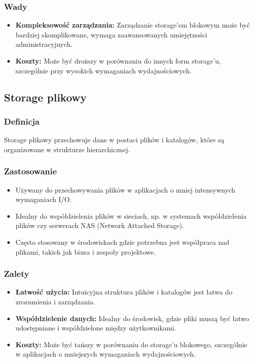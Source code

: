 \documentclass[polish,envcountsect,10pt]{article}
\begin{document}
\subsubsection{Wady}
\begin{itemize}
    \item \textbf{Kompleksowość zarządzania:} Zarządzanie storage'em blokowym może być bardziej skomplikowane, wymaga zaawansowanych umiejętności administracyjnych.
    \item \textbf{Koszty:} Może być droższy w porównaniu do innych form storage'u, szczególnie przy wysokich wymaganiach wydajnościowych.
\end{itemize}

\subsection{Storage plikowy}

\subsubsection{Definicja}
Storage plikowy przechowuje dane w postaci plików i katalogów, które są organizowane w strukturze hierarchicznej.

\subsubsection{Zastosowanie}
\begin{itemize}
    \item Używany do przechowywania plików w aplikacjach o mniej intensywnych wymaganiach I/O.
    \item Idealny do współdzielenia plików w sieciach, np. w systemach współdzielenia plików czy serwerach NAS (Network Attached Storage).
    \item Często stosowany w środowiskach gdzie potrzebna jest współpraca nad plikami, takich jak biura i zespoły projektowe.
\end{itemize}

\subsubsection{Zalety}
\begin{itemize}
    \item \textbf{Łatwość użycia:} Intuicyjna struktura plików i katalogów jest łatwa do zrozumienia i zarządzania.
    \item \textbf{Współdzielenie danych:} Idealny do środowisk, gdzie pliki muszą być łatwo udostępniane i współdzielone między użytkownikami.
    \item \textbf{Koszty:} Może być tańszy w porównaniu do storage'u blokowego, szczególnie w aplikacjach o mniejszych wymaganiach wydajnościowych.
\end{itemize}
\end{document}
